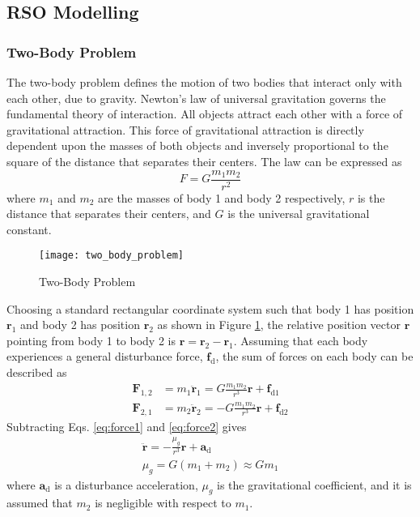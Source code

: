 \documentclass[]{aiaa-tc}%
\begin{document}
\subsection{RSO Modelling}

\subsubsection{Two-Body Problem}

The two-body problem defines the motion of two bodies that interact only with each other, due to gravity. Newton's law of universal gravitation governs the fundamental theory of interaction. All objects attract each other with a force of gravitational attraction. This force of gravitational attraction is directly dependent upon the masses of both objects and inversely proportional to the square of the distance that separates their centers. The law can be expressed as
\begin{equation}
F=G\frac{m_1m_2}{r^2}
\end{equation}
where $m_1$ and $m_2$ are the masses of body 1 and body 2 respectively, $r$ is the distance that separates their centers, and $G$ is the universal gravitational constant.\\

\begin{figure}[h]
  \centering
    \texttt{[image: two\_body\_problem]}
  \caption{Two-Body Problem}
  \label{fig:two_body_problem}
\end{figure}

Choosing a standard rectangular coordinate system such that body 1 has position $\mathbf{r}_1$ and body 2 has position $\mathbf{r}_2$ as shown in Figure \ref{fig:two_body_problem}, the relative position vector $\mathbf{r}$ pointing from body 1 to body 2 is $\mathbf{r}=\mathbf{r}_2-\mathbf{r}_1$. Assuming that each body experiences a general disturbance force, $\mathbf{f}_{\text{d}}$, the sum of forces on each body can be described as
\begin{subequations}
\begin{align}
\label{eq:force1}
\mathbf{F}_{1,2}&=m_1\mathbf{\ddot{r}}_1=G\frac{m_1m_2}{r^3}\mathbf{r}+\mathbf{f}_{\text{d1}}\\
\label{eq:force2}
\mathbf{F}_{2,1}&=m_2\mathbf{\ddot{r}}_2=-G\frac{m_1m_2}{r^3}\mathbf{r}+\mathbf{f}_{\text{d2}}
\end{align}
\end{subequations}
Subtracting Eqs. \eqref{eq:force1} and \eqref{eq:force2} gives
\begin{subequations}
\begin{gather}
\label{eq:rddot}
\mathbf{\ddot{r}}=-\frac{\mu_g}{r^3}\mathbf{r}+\mathbf{a}_{\text{d}}\\
\mu_g=G(m_1+m_2)\approx G m_1
\end{gather}
\end{subequations}
where $\mathbf{a}_{\text{d}}$ is a disturbance acceleration, $\mu_g$ is the gravitational coefficient, and it is assumed that $m_2$ is negligible with respect to $m_1$.\\
\end{document}
